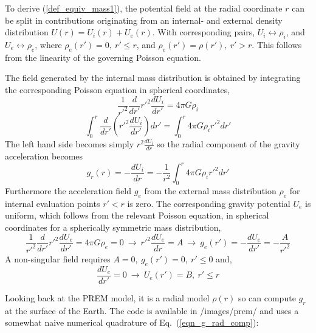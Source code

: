 To derive (\ref{def_equiv_mass1}), the potential field at the 
radial coordinate $r$ 
can be split in contributions originating from an internal- and external density 
distribution $U(r) = U_i (r) + U_e (r)$.
With corresponding pairs, 
$U_i \leftrightarrow \rho_i$, 
and
$U_e \leftrightarrow \rho_e$,
where
$\rho_e(r') = 0, ~r' \le r$,
and
$\rho_e(r') = \rho(r'), ~r' > r$.
This follows from the linearity of the governing Poisson equation.

The field generated by the internal mass distribution is obtained
by integrating the corresponding Poisson equation in spherical 
coordinates,
\begin{equation}
  \frac{1}{r'^2}
  \frac{d}{dr'} r'^2
  \frac{dU_i}{dr'}
   =
  4\pi G \rho_i
\end{equation}
\begin{equation}
  \int_0^r
      \frac{d}{dr'} \left ( r'^2 \frac{dU_i}{dr'} \right ) dr'
   =
  \int_0^r 4\pi G \rho_i r'^2 dr'
\end{equation}
The left hand side becomes simply $ r^2 \frac{dU_i}{dr} $ so 
the radial component of the gravity acceleration becomes
\begin{equation}
   g_r(r) = - \frac{dU_i}{dr} 
          = - \frac{1}{r^2} \int_0^r 4\pi G \rho_i r'^2 dr'
\label{eqn_g_rad_comp}
\end{equation}
Furthermore the acceleration field $g_e$ from the external
mass distribution $\rho_e$ for internal evaluation points
$r'<r$ is zero.
The corresponding gravity potential $U_e$ is uniform,
which follows from the relevant Poisson equation,
in spherical coordinates for a spherically symmetric mass distribution,
\begin{equation}
   \frac{1}{r'^2} \frac{d}{dr'} r'^2 \frac{dU_e}{dr'}
    =
   4\pi G \rho_e 
    = 0
   ~\rightarrow~ 
   r'^2 \frac{dU_e}{dr} = A
   ~\rightarrow~ 
   g_e(r') = - \frac{dU_e}{dr'} = -\frac{A}{r'^2}
\end{equation}
A non-singular field requires $A=0,~g_e(r')=0,~r' \le 0$ and,
\begin{equation}
   \frac{dU_e}{dr'} = 0 ~\rightarrow~ U_e(r') = B,~r' \le r
\end{equation}

Looking back at the PREM model, it is a radial model $\rho(r)$ so 
can compute $g_r$ at the surface of the Earth. The code 
is available in /images/prem/ and uses a somewhat naive 
numerical quadrature of Eq.~(\ref{eqn_g_rad_comp}):

